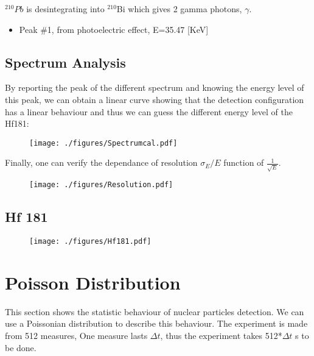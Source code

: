 \documentclass[a4paper,12pt,oneside]{article}
\begin{document}
$^{210}Pb$ is desintegrating into $^{210}$Bi which gives 2 gamma photons, $\gamma$.

\begin{itemize}
\item Peak \#1, from photoelectric effect, E=35.47 [KeV]
\end{itemize}

\newpage
\subsection{Spectrum Analysis}
By reporting the peak of the different spectrum and knowing the energy level of this peak, we can obtain a linear curve showing that the detection configuration has a linear behaviour and thus we can guess the different energy level of the Hf181:

\begin{figure}[h!]
  \begin{center}
  \texttt{[image: ./figures/Spectrumcal.pdf]}
  \caption{} \label{fig:calibrate}
  \end{center}
\end{figure}

Finally, one can verify the dependance of resolution $\sigma_E/E$ function of $\frac{1}{\sqrt{E}}$.
\begin{figure}[h!]
  \begin{center}
  \texttt{[image: ./figures/Resolution.pdf]}
  \caption{} \label{fig:resolution}
  \end{center}
\end{figure}

\newpage
\subsection{Hf 181}
\begin{figure}[h!]
  \begin{center}
  \texttt{[image: ./figures/Hf181.pdf]}
  \caption{} \label{fig:Hf181}
  \end{center}
\end{figure}

\newpage
\section{Poisson Distribution}

This section shows the statistic behaviour of nuclear particles detection. We can use a Poissonian distribution to describe this behaviour.
The experiment is made from 512 measures, One measure lasts $\Delta t$, thus the experiment takes 512*$\Delta t$ s to be done.
\end{document}
